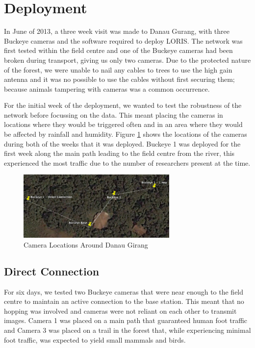 	\section{Deployment}\label{loris:dep}
		In June of 2013, a three week visit was made to Danau Gurang, with three Buckeye cameras and the software required to deploy LORIS. The network was first tested within the field centre and one of the Buckeye cameras had been broken during transport, giving us only two cameras. Due to the protected nature of the forest, we were unable to nail any cables to trees to use the high gain antenna and it was no possible to use the cables without first securing them; because animals tampering with cameras was a common occurrence.
		
		For the initial week of the deployment, we wanted to test the robustness of the network before focussing on the data. This meant placing the cameras in locations where they would be triggered often and in an area where they would be affected by rainfall and humidity. Figure \ref{cam_locs} shows the locations of the cameras during both of the weeks that it was deployed. Buckeye 1 was deployed for the first week along the main path leading to the field centre from the river, this experienced the most traffic due to the number of researchers present at the time. 
	
	    \begin{figure}[!t]
	    \centering
		\includegraphics[width=0.70\textwidth]{Chap6/figures/buckeye}
	    \caption{Camera Locations Around Danau Girang}
	    \label{cam_locs}
	    \end{figure}
	
		\subsection{Direct Connection}
		For six days, we tested two Buckeye cameras that were near enough to the field centre to maintain an active connection to the base station. This meant that no hopping was involved and cameras were not reliant on each other to transmit images. Camera 1 was placed on a main path that guaranteed human foot traffic and Camera 3 was placed on a trail in the forest that, while experiencing minimal foot traffic, was expected to yield small mammals and birds.
		
